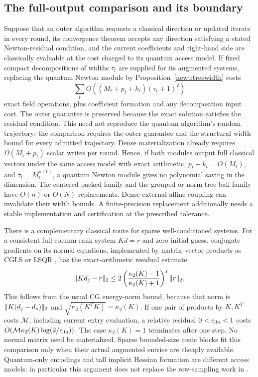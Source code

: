 \subsection{The full-output comparison and its boundary}

Suppose that an outer algorithm requests a classical direction or updated
iterate in every round, its convergence theorem accepts any direction
satisfying a stated Newton-residual condition, and the current coefficients and right-hand side are
classically evaluable at the cost charged to its quantum access model.
If fixed compact decompositions of widths $\tau_t$ are supplied for its
augmented systems, replacing the quantum Newton module by
Proposition~\ref{newt:treewidth} costs
\begin{equation}\label{newt:replacement}
 \sum_t O((M_t+p_t+k_t)(\tau_t+1)^2)
\end{equation}
exact field operations, plus coefficient formation and any decomposition
input cost.  The outer guarantee is preserved because the exact solution
satisfies the residual condition.  This need not reproduce the quantum
algorithm's random trajectory; the comparison requires the outer
guarantee and the structural width bound for every admitted trajectory.
Dense materialization already requires $\Omega(M_t+p_t)$ scalar writes
per round.  Hence, if both modules output full classical vectors under
the same access model with exact arithmetic, $p_t+k_t=O(M_t)$, and
$\tau_t=M_t^{o(1)}$, a quantum Newton module gives no polynomial saving
in the dimension.  The centered packed
family and the grouped or norm-tree ball family have $O(n)$ or $O(N)$
replacements.  Dense external affine coupling can invalidate their width
bounds.  A finite-precision replacement additionally needs a stable
implementation and certification at the prescribed tolerance.

There is a complementary classical route for sparse well-conditioned
systems.  For a consistent full-column-rank system $Kd=r$ and zero
initial guess, conjugate gradients on its normal equations, implemented
by matrix--vector products as CGLS or LSQR \citep{PaigeSaunders1982},
has the exact-arithmetic residual estimate
\[
 \lVert Kd_j-r\rVert_2\leq
 2\left(\frac{\kappa_2(K)-1}{\kappa_2(K)+1}\right)^j\lVert r\rVert_2.
\]
This follows from the usual CG energy-norm bound, because that norm is
$\lVert K(d_j-d_*)\rVert_2$ and
$\sqrt{\kappa_2(K^TK)}=\kappa_2(K)$.
If one pair of products by $K,K^T$ costs $\mathcal M$, including current
entry evaluation, a relative residual $0<\epsilon_{\rm lin}<1$ costs
$O(\mathcal M\kappa_2(K)\log(2/\epsilon_{\rm lin}))$.
The case $\kappa_2(K)=1$ terminates after one step.  No normal matrix
need be materialized.  Sparse bounded-size conic blocks fit this
comparison only when their actual augmented entries are cheaply
available.  Quantum-only encodings and tall implicit Hessian formation
are different access models; in particular this argument does not
replace the row-sampling work in \citet{ApersGribling2026}.

